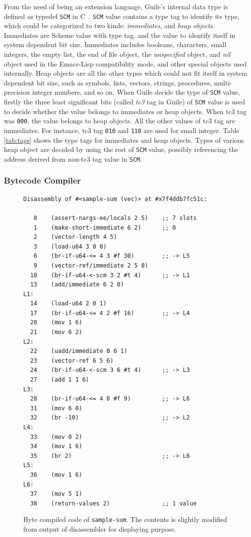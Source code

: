 \documentclass[preprint]{sigplanconf}
\begin{document}
From the need of being an extension language, Guile's internal data type is
defined as typedef \texttt{SCM} in
C~\cite{Galassi02guilereference}. \texttt{SCM} value contains a type tag to
identify its type, which could be categorized to two kinds:
\textit{immediates}, and \textit{heap objects}. Immediates are Scheme value
with type tag, and the value to identify itself in system dependent bit
size. Immediates includes booleans, characters, small integers, the empty
list, the end of file object, the \textit{unspecified} object, and
\textit{nil} object used in the Emacs-Lisp compatibility mode, and other
special objects used internally. Heap objects are all the other types which
could not fit itself in system dependent bit size, such as symbols, lists,
vectors, strings, procedures, multi-precision integer numbers, and so on.
When Guile decide the type of \texttt{SCM} value, firstly the three least
significant bits (called \textit{tc3} tag in Guile) of \texttt{SCM} value is
used to decide whether the value belongs to immediates or heap objects. When
tc3 tag was \texttt{000}, the value belongs to heap objects. All the other
values of tc3 tag are immediates. For instance, tc3 tag \texttt{010} and
\texttt{110} are used for small integer. Table
\hyperref[tab:tags]{\ref{tab:tags}} shows the type tags for immediates and
heap objects. Types of various heap object are decided by using the rest of
\texttt{SCM} value, possibly referencing the address derived from non-tc3 tag
value in \texttt{SCM}.

\subsubsection{Bytecode Compiler}

\begin{figure}
  \begin{center}
\begin{verbatim}
Disassembly of #<sample-sum (vec)> at #x7f4ddb7fc51c:

   0    (assert-nargs-ee/locals 2 5)    ;; 7 slots
   1    (make-short-immediate 6 2)      ;; 0
   2    (vector-length 4 5)
   3    (load-u64 3 0 0)
   6    (br-if-u64-<= 4 3 #f 30)        ;; -> L5
   9    (vector-ref/immediate 2 5 0)
  10    (br-if-u64-<-scm 3 2 #t 4)      ;; -> L1
  13    (add/immediate 6 2 0)
L1:
  14    (load-u64 2 0 1)
  17    (br-if-u64-<= 4 2 #f 16)        ;; -> L4
  20    (mov 1 6)
  21    (mov 6 2)
L2:
  22    (uadd/immediate 0 6 1)
  23    (vector-ref 6 5 6)
  24    (br-if-u64-<-scm 3 6 #t 4)      ;; -> L3
  27    (add 1 1 6)
L3:
  28    (br-if-u64-<= 4 0 #f 9)         ;; -> L6
  31    (mov 6 0)
  32    (br -10)                        ;; -> L2
L4:
  33    (mov 0 2)
  34    (mov 1 6)
  35    (br 2)                          ;; -> L6
L5:
  36    (mov 1 6)
L6:
  37    (mov 5 1)
  38    (return-values 2)               ;; 1 value
\end{verbatim}
\end{center}
\caption{Byte compiled code of \texttt{sample-sum}. The contents is slightly
  modified from output of disassembler for displaying purpose.}
\label{fig:bytecode}
\end{figure}
\end{document}
